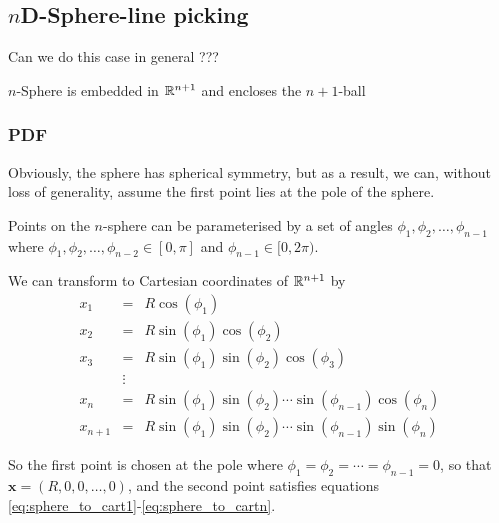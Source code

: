 \subsection{$n$D-Sphere-line picking}
\label{sec:nsphere_line}

Can we do this case in general ???

$n$-Sphere is embedded in $\mathbb{R}^{n+1}$ and encloses the $n+1$-ball

\subsubsection{PDF}

Obviously, the sphere has spherical symmetry, but as a result, we can,
without loss of generality, assume the first point lies at the pole of
the sphere.

Points on the $n$-sphere can be parameterised by a set of angles
$\phi_1, \phi_2, \ldots, \phi_{n-1}$ where $\phi_1, \phi_2, \ldots,
\phi_{n-2}\in [0,\pi]$ and $\phi_{n-1}\in [0,2\pi)$. 


We can transform to Cartesian coordinates of $\mathbb{R}^{n+1}$ by
\begin{eqnarray}
  \label{eq:sphere_to_cart1}
  x_1 & = & R \cos (\phi_1 ) \\
  x_2 & = & R \sin(\phi_1) \cos (\phi_2 ) \\
  x_3 & = & R \sin(\phi_1) \sin(\phi_2) \cos (\phi_3 ) \\
      & \vdots & \\
  x_{n} & = & R \sin (\phi_1) \sin(\phi_2) \cdots \sin (\phi_{n-1}) \cos (\phi_{n})  \\
  x_{n+1} & = & R \sin (\phi_1) \sin(\phi_2) \cdots \sin (\phi_{n-1}) \sin (\phi_{n}) 
  \label{eq:sphere_to_cartn}
\end{eqnarray}

So the first point is chosen at the pole where
$\phi_1=\phi_2=\cdots=\phi_{n-1}=0$, so that ${\mathbf x} =
(R,0,0,\ldots,0)$, and the second point satisfies equations
\eqref{eq:sphere_to_cart1}-\eqref{eq:sphere_to_cartn}. 

